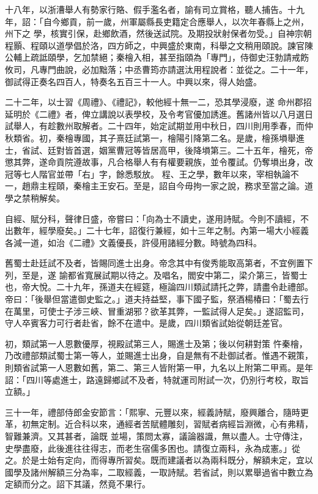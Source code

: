 \begin{pinyinscope}
 十八年，以浙漕舉人有勢家行賂、假手濫名者，諭有司立賞格，聽人捕告。十九年，詔：「自今鄉貢，前一歲，州軍屬縣長吏籍定合應舉人，以次年春縣上之州，州下之
 學，核實引保，赴鄉飲酒，然後送試院。及期投狀射保者勿受。」自神宗朝程顥、程頤以道學倡於洛，四方師之，中興盛於東南，科舉之文稍用頤說。諫官陳公輔上疏詆頤學，乞加禁絕；秦檜入相，甚至指頤為「專門」，侍御史汪勃請戒飭攸司，凡專門曲說，必加黜落；中丞曹筠亦請選汰用程說者：並從之。二十一年，御試得正奏名四百人，特奏名五百三十一人。中興以來，得人始盛。



 二十二年，以士習《周禮》、《禮記》，較他經十無一二，恐其學浸廢，遂
 命州郡招延明於《二禮》者，俾立講說以表學校，及令考官優加誘進。舊諸州皆以八月選日試舉人，有趁數州取解者。二十四年，始定試期並用中秋日，四川則用季春，而仲秋類省。初，秦檜專國，其子熹廷試第一，檜陽引降第二名。是歲，檜孫塤舉進士，省試、廷對皆首選，姻黨曹冠等皆居高甲，後降塤第三。二十五年，檜死，帝懲其弊，遂命貢院遵故事，凡合格舉人有有權要親族，並令覆試。仍奪塤出身，改冠等七人階官並帶「右」字，餘悉駁放。
 程、王之學，數年以來，宰相執論不一，趙鼎主程頤，秦檜主王安石。至是，詔自今毋拘一家之說，務求至當之論。道學之禁稍解矣。



 自經、賦分科，聲律日盛，帝嘗曰：「向為士不讀史，遂用詩賦。今則不讀經，不出數年，經學廢矣。」二十七年，詔復行兼經，如十三年之制。內第一場大小經義各減一道，如治《二禮》文義優長，許侵用諸經分數。時號為四科。



 舊蜀士赴廷試不及者，皆賜同進士出身。帝念其中有俊秀能取高第者，不宜例置下列，至是，遂
 諭都省寬展試期以待之。及唱名，閻安中第二，梁介第三，皆蜀士也，帝大悅。二十九年，孫道夫在經筵，極論四川類試請托之弊，請盡令赴禮部。帝曰：「後舉但當遣御史監之。」道夫持益堅，事下國子監，祭酒楊椿曰：「蜀去行在萬里，可使士子涉三峽、冒重湖邪？欲革其弊，一監試得人足矣。」遂詔監司，守人卒賓客力可行者赴省，餘不在遣中。是歲，四川類省試始從朝廷差官。



 初，類試第一人恩數優厚，視殿試第三人，賜進士及第；後以何耕對策
 忤秦檜，乃改禮部類試蜀士第一等人，並賜進士出身，自是無有不赴御試者。惟遇不親策，則類省試第一人恩數如舊，第二、第三人皆附第一甲，九名以上附第二甲焉。是年詔：「四川等處進士，路遠歸鄉試不及者，特就運司附試一次，仍別行考校，取旨立額。」



 三十一年，禮部侍郎金安節言：「熙寧、元豐以來，經義詩賦，廢興離合，隨時更革，初無定制。近合科以來，通經者苦賦體雕刻，習賦者病經旨淵微，心有弗精，智難兼濟。又其甚者，論既
 並場，策問太寡，議論器識，無以盡人。士守傳注，史學盡廢，此後進往往得志，而老生宿儒多困也。請復立兩科，永為成憲。」從之。於是士始有定向，而得專所習矣。既而建議者以為兩科既分，解額未定，宜以國學及諸州解額三分為率，二取經義，一取詩賦。若省試，則以累舉過省中數立為定額而分之。詔下其議，然竟不果行。




\end{pinyinscope}
